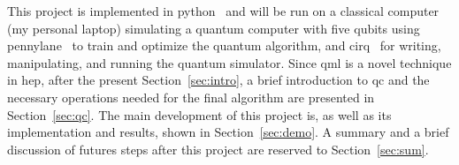 This project is implemented in python~\cite{python} and will be run on a 
classical computer (my personal laptop) simulating a quantum computer with five 
qubits using pennylane~\cite{pennylane} to train and optimize the quantum 
algorithm, and cirq~\cite{cirq} for writing, manipulating, and running the 
quantum simulator.
Since \gls{qml} is a novel technique in \gls{hep}, after the present Section~\ref{sec:intro},
a brief introduction to \gls{qc} and the necessary operations needed for the 
final algorithm are presented in Section~\ref{sec:qc}. 
The main development of this project is, as well as its implementation and 
results, shown in Section~\ref{sec:demo}.
A summary and a brief discussion of futures steps after this project are 
reserved to Section~\ref{sec:sum}.